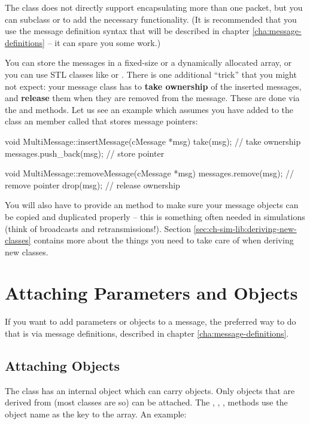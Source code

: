 The  class does not directly support encapsulating more
than one packet, but you can subclass  or 
to add the necessary functionality. (It is recommended that you
use the message definition syntax that will be described in chapter
\ref{cha:message-definitions} -- it can spare you some work.)

You can store the messages in a fixed-size or a dynamically allocated
array, or you can use STL classes like  or .
There is one additional ``trick'' that you might not expect: your message
class has to \textbf{take ownership} of the inserted messages, and
\textbf{release} them when they are removed from the message. These are
done via the  and  methods. Let us see
an example which assumes you have added to the class an  member
called  that stores message pointers:

\begin{cpp}
void MultiMessage::insertMessage(cMessage *msg)
{
    take(msg);  // take ownership
    messages.push_back(msg);  // store pointer
}

void MultiMessage::removeMessage(cMessage *msg)
{
    messages.remove(msg);  // remove pointer
    drop(msg);  // release ownership
}
\end{cpp}

You will also have to provide an  method to
make sure your message objects can be copied and duplicated
properly -- this is something often needed in simulations
(think of broadcasts and retransmissions!). Section
\ref{sec:ch-sim-lib:deriving-new-classes} contains more
about the things you need to take care of when deriving new classes.



\section{Attaching Parameters and Objects}
\label{sec:ch-msgs:attaching-objects}

If you want to add parameters or objects to a message, the preferred
way to do that is via message definitions, described in chapter
\ref{cha:message-definitions}.


\subsection{Attaching Objects}

The  class has an internal  object which can
carry objects. Only objects
that are derived from  (most {\opp} classes are so) can be attached.
The , , ,
 methods use the object name
as the key to the array. An example:

